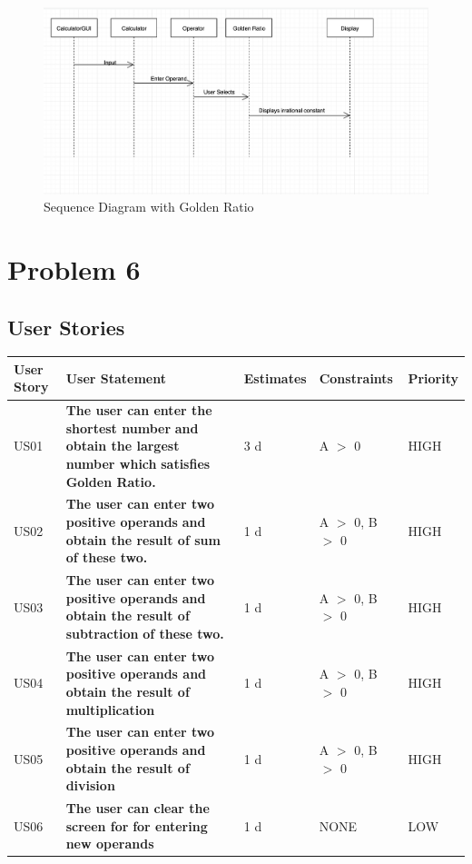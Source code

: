 \documentclass[12pt]{extarticle}
\begin{document}
\begin{figure}[htb!]
  \includegraphics[width=1\textwidth]{scenario2.png}
  \centering
  \caption{Sequence Diagram with Golden Ratio}
\end{figure}

\newpage
\section{Problem 6}
\subsection{User Stories}
\begin{table}[h]
\centering
\begin{tabular}{|p{1cm}|p{6cm}|p{2cm}|p{2cm}|p{2cm}|}
\hline
\textbf{User} \textbf{Story}  & User Statement & Estimates & Constraints & Priority \\
\hline
US01 & \textbf{ The user can enter the shortest number}\textbf{ and obtain the largest number which } \textbf{satisfies Golden Ratio.} &  3 d & A $>$ 0 & HIGH\\
\hline
 US02 & \textbf{ The user can enter two positive operands} \textbf{and obtain the result of sum} \textbf{of these two.} & 1 d & A $>$ 0, B $>$ 0 & HIGH\\
\hline
 US03 & \textbf{ The user can enter two positive operands} \textbf{and obtain the result of subtraction} \textbf{of these two.}& 1 d & A $>$ 0, B $>$ 0  & HIGH \\
\hline
 US04 & \textbf{ The user can enter two positive operands and obtain the result of multiplication} & 1 d & A $>$ 0, B $>$ 0 & HIGH \\
\hline
 US05 & \textbf{ The user can enter two positive operands} \textbf{and obtain the result of division} & 1 d &  A $>$ 0, B $>$ 0 & HIGH\\
\hline
  US06 & \textbf{ The user can clear the screen for} \textbf{for entering new operands} & 1 d &  NONE & LOW\\
\hline

\end{tabular}
\end{table}
\newpage
\end{document}
